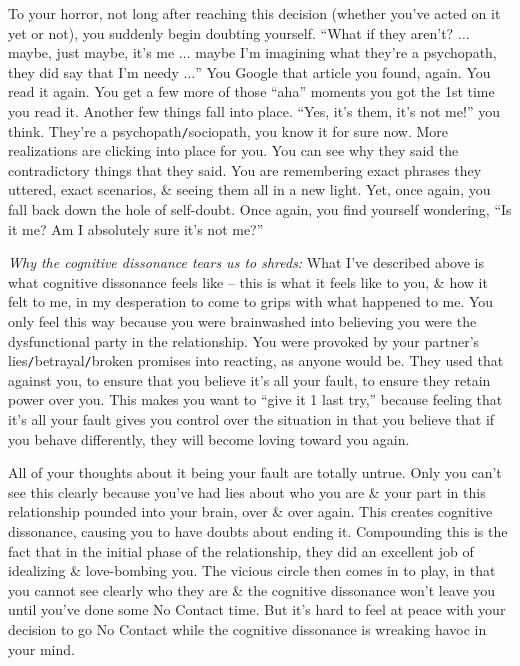 \documentclass{article}
\numberwithin{equation}{section}
\begin{document}
To your horror, not long after reaching this decision (whether you've acted on it yet or not), you suddenly begin doubting yourself. ``What if they aren't? $\ldots$ maybe, just maybe, it's me $\ldots$ maybe I'm imagining what they're a psychopath, they did say that I'm needy $\ldots$'' You Google that article you found, again. You read it again. You get a few more of those ``aha'' moments you got the 1st time you read it. Another few things fall into place. ``Yes, it's them, it's not me!'' you think. They're a psychopath\texttt{/}sociopath, you know it for sure now. More realizations are clicking into place for you. You can see why they said the contradictory things that they said. You are remembering exact phrases they uttered, exact scenarios, \& seeing them all in a new light. Yet, once again, you fall back down the hole of self-doubt. Once again, you find yourself wondering, ``Is it me? Am I absolutely sure it's not me?''

\textit{Why the cognitive dissonance tears us to shreds:} What I've described above is what cognitive dissonance feels like -- this is what it feels like to you, \& how it felt to me, in my desperation to come to grips with what happened to me. You only feel this way because you were brainwashed into believing you were the dysfunctional party in the relationship. You were provoked by your partner's lies\texttt{/}betrayal\texttt{/}broken promises into reacting, as anyone would be. They used that against you, to ensure that you believe it's all your fault, to ensure they retain power over you. This makes you want to ``give it 1 last try,'' because feeling that it's all your fault gives you control over the situation in that you believe that if you behave differently, they will become loving toward you again.

All of your thoughts about it being your fault are totally untrue. Only you can't see this clearly because you've had lies about who you are \& your part in this relationship pounded into your brain, over \& over again. This creates cognitive dissonance, causing you to have doubts about ending it. Compounding this is the fact that in the initial phase of the relationship, they did an excellent job of idealizing \& love-bombing you. The vicious circle then comes in to play, in that you cannot see clearly who they are \& the cognitive dissonance won't leave you until you've done some No Contact time. But it's hard to feel at peace with your decision to go No Contact while the cognitive dissonance is wreaking havoc in your mind.
\end{document}
